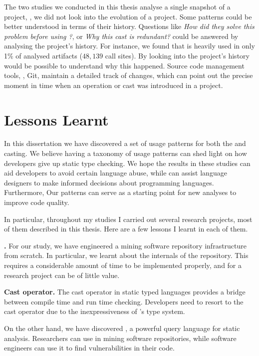 The two studies we conducted in this thesis analyse a single snapshot of a project,
\ie{}, we did not look into the evolution of a project.
Some patterns could be better understood in terms of their history.
Questions like
\emph{How did they solve this problem before using \unsafe{}?},
or \emph{Why this cast is redundant?}
could be answered by analysing the project's history. 
For instance,
we found that \smu{} is heavily used in only 1\% of analysed artifacts
($48,139$ call sites).
By looking into the project's history would be possible to understand why this happened.
Source code management tools, \eg{}, Git,
maintain a detailed track of changes,
which can point out the precise moment in time when an \unsafe{} operation or cast was introduced in a project.

\section{Lessons Learnt}

In this dissertation we have discovered a set of usage patterns for both the \unsafe{} \api{} and casting.
We believe having a taxonomy of usage patterns can shed light on how \java{} developers give up static type checking.
We hope the results in these studies can aid developers to avoid certain language abuse,
while can assist language designers to make informed decisions about programming languages.
Furthermore,
Our patterns can serve as a starting point for new analyses to improve code quality.

In particular,
throughout my \phd{} studies I carried out several research projects,
most of them described in this thesis.
Here are a few lessons I learnt in each of them.

\textbf{\unsafe{} \api{}.}
For our \unsafe{} study,
we have engineered a mining software repository infrastructure from scratch.
In particular,
we learnt about the internals of the \mavencentral{} repository.
This requires a considerable amount of time to be implemented properly,
and for a research project can be of little value.

\textbf{Cast operator.}
The cast operator in static typed languages provides a bridge between compile time and run time checking.
Developers need to resort to the cast operator due to the inexpressiveness of \java{}'s type system. 

On the other hand, we have discovered \ql{},
a powerful query language for static analysis.
Researchers can use \ql{} in mining software repositories,
while software engineers can use it to find vulnerabilities in their code.

